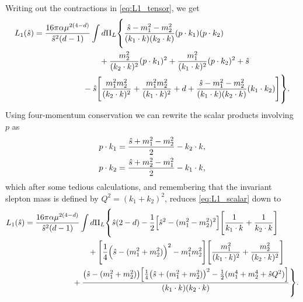 Writing out the contractions in \cref{eq:L1_tensor}, we get
\begin{equation}
\begin{split}
    L_1(\shat)
    &= \frac{16\pi\alpha\mu^{2(4-d)}}{\shat^2(d-1)}
    \int d\Pi_L \vastl\{
        \frac{\shat-m_1^2-m_2^2}{(k_1\cdot k)(k_2\cdot k)}(p\cdot k_1)(p\cdot k_2)
        \\ &\hspace{8em}
        +\frac{m_2^2}{(k_2\cdot k)^2}(p\cdot k_1)^2
        + \frac{m_1^2}{(k_1\cdot k)^2}(p\cdot k_2)^2
        + \shat
        \\ &\hspace{6em}
        - \shat \Biggl[
            \frac{m_1^2m_2^2}{(k_2\cdot k)^2}
            + \frac{m_1^2m_2^2}{(k_1\cdot k)^2}
            + d
            + \frac{\shat-m_1^2-m_2^2}{(k_1\cdot k)(k_2\cdot k)}(k_1\cdot k_2)
        \Biggr]
    \vastr\}.
\end{split}
\label{eq:L1_scalar}
\end{equation}
Using four-momentum conservation we can rewrite the scalar products involving $p$ as
\begin{subequations}
\begin{align}
    p \cdot k_1 &= \frac{\hat{s}+m_1^2-m_2^2}{2} - k_2\cdot k,
    \\
    p \cdot k_2 &= \frac{\hat{s}+m_2^2-m_1^2}{2} - k_1\cdot k,
\end{align}
\end{subequations}
which after some tedious calculations, and remembering that the invariant slepton mass is defined by $Q^2=(k_1+k_2)^2$, reduces \cref{eq:L1_scalar} down to
\begin{equation}
\begin{split}
    L_1(\shat)
    &= \frac{16\pi\alpha\mu^{2(4-d)}}{\shat^2(d-1)}
    \int d\Pi_L \vastl\{
        \shat(2-d)
        - \frac{1}{2} \Bigl[\shat^2-(m_1^2-m_2^2)^2\Bigr] \Biggl[ \frac{1}{k_1\cdot k} + \frac{1}{k_2\cdot k} \Biggr]
        \\ &\hspace{8em}
        + \Biggl[
            \frac{1}{4}\Bigl(\shat-(m_1^2+m_2^2)\Bigr)^2
            -m_1^2m_2^2
        \Biggr] \Biggl[
            \frac{m_1^2}{(k_1\cdot k)^2}
            + \frac{m_2^2}{(k_2\cdot k)^2}
        \Biggr]
        \\ &\hspace{6em}
        + \frac{\bigl(\shat-(m_1^2+m_2^2)\bigr) \Bigl[ \frac{1}{4}\bigl(\shat+(m_1^2+m_2^2)\bigr)^2 - \frac{1}{2}(m_1^4+m_2^4+\shat Q^2) \Bigr]}{(k_1\cdot k)(k_2\cdot k)}
    \vastr\}.
\end{split}
\end{equation}
